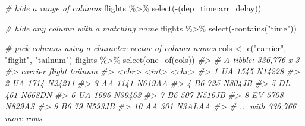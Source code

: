 \documentclass[
]{book}
\newenvironment{Shaded}{\begin{snugshade}}{\end{snugshade}}
\newcommand{\CommentTok}[1]{\textcolor[rgb]{0.56,0.35,0.01}{\textit{#1}}}
\newcommand{\FunctionTok}[1]{\textcolor[rgb]{0.00,0.00,0.00}{#1}}
\newcommand{\NormalTok}[1]{#1}
\newcommand{\OtherTok}[1]{\textcolor[rgb]{0.56,0.35,0.01}{#1}}
\newcommand{\SpecialCharTok}[1]{\textcolor[rgb]{0.00,0.00,0.00}{#1}}
\newcommand{\StringTok}[1]{\textcolor[rgb]{0.31,0.60,0.02}{#1}}
\begin{document}
\begin{Shaded}
\begin{Highlighting}[]
\CommentTok{\# hide a range of columns}
\NormalTok{flights }\SpecialCharTok{\%\textgreater{}\%} \FunctionTok{select}\NormalTok{(}\SpecialCharTok{{-}}\NormalTok{(dep\_time}\SpecialCharTok{:}\NormalTok{arr\_delay))}

\CommentTok{\# hide any column with a matching name}
\NormalTok{flights }\SpecialCharTok{\%\textgreater{}\%} \FunctionTok{select}\NormalTok{(}\SpecialCharTok{{-}}\FunctionTok{contains}\NormalTok{(}\StringTok{"time"}\NormalTok{))}
\end{Highlighting}
\end{Shaded}

\begin{Shaded}
\begin{Highlighting}[]
\CommentTok{\# pick columns using a character vector of column names}
\NormalTok{cols }\OtherTok{\textless{}{-}} \FunctionTok{c}\NormalTok{(}\StringTok{"carrier"}\NormalTok{, }\StringTok{"flight"}\NormalTok{, }\StringTok{"tailnum"}\NormalTok{)}
\NormalTok{flights }\SpecialCharTok{\%\textgreater{}\%} \FunctionTok{select}\NormalTok{(}\FunctionTok{one\_of}\NormalTok{(cols))}
\CommentTok{\#\textgreater{} \# A tibble: 336,776 x 3}
\CommentTok{\#\textgreater{}    carrier flight tailnum}
\CommentTok{\#\textgreater{}    \textless{}chr\textgreater{}    \textless{}int\textgreater{} \textless{}chr\textgreater{}  }
\CommentTok{\#\textgreater{}  1 UA        1545 N14228 }
\CommentTok{\#\textgreater{}  2 UA        1714 N24211 }
\CommentTok{\#\textgreater{}  3 AA        1141 N619AA }
\CommentTok{\#\textgreater{}  4 B6         725 N804JB }
\CommentTok{\#\textgreater{}  5 DL         461 N668DN }
\CommentTok{\#\textgreater{}  6 UA        1696 N39463 }
\CommentTok{\#\textgreater{}  7 B6         507 N516JB }
\CommentTok{\#\textgreater{}  8 EV        5708 N829AS }
\CommentTok{\#\textgreater{}  9 B6          79 N593JB }
\CommentTok{\#\textgreater{} 10 AA         301 N3ALAA }
\CommentTok{\#\textgreater{} \# ... with 336,766 more rows}
\end{Highlighting}
\end{Shaded}
\end{document}
